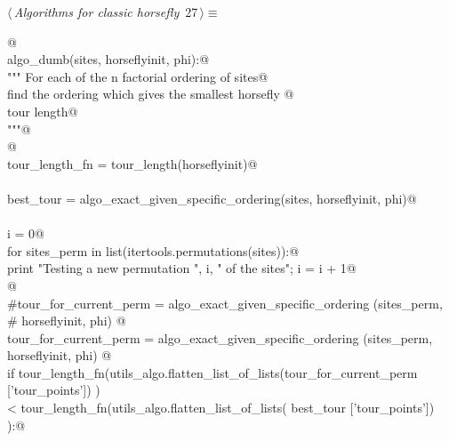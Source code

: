 \documentclass[11.5pt]{report}
\begin{document}
\begin{flushleft} \small
\begin{minipage}{\linewidth}\label{scrap34}\raggedright\small
{} $\langle\,${\itshape Algorithms for classic horsefly}\nobreak\ {\footnotesize {27}}$\,\rangle\equiv$
\vspace{-1ex}
\begin{list}{}{} \item
\mbox{}\verb@   @\\
\mbox{}\verb@def algo_dumb(sites, horseflyinit, phi):@\\
\mbox{}\verb@    """ For each of the n factorial ordering of sites@\\
\mbox{}\verb@    find the ordering which gives the smallest horsefly @\\
\mbox{}\verb@    tour length@\\
\mbox{}\verb@    """@\\
\mbox{}\verb@    @\\
\mbox{}\verb@    tour_length_fn = tour_length(horseflyinit)@\\
\mbox{}\verb@@\\
\mbox{}\verb@    best_tour = algo_exact_given_specific_ordering(sites, horseflyinit, phi)@\\
\mbox{}\verb@@\\
\mbox{}\verb@    i = 0@\\
\mbox{}\verb@    for sites_perm in list(itertools.permutations(sites)):@\\
\mbox{}\verb@        print "Testing a new permutation ", i, " of the sites"; i = i + 1@\\
\mbox{}\verb@          @\\
\mbox{}\verb@        #tour_for_current_perm = algo_exact_given_specific_ordering (sites_perm, \@\\
\mbox{}\verb@        #                                                             horseflyinit, phi) @\\
\mbox{}\verb@        tour_for_current_perm = algo_exact_given_specific_ordering (sites_perm, \@\\
\mbox{}\verb@                                                                    horseflyinit, phi) @\\
\mbox{}\verb@        if tour_length_fn(utils_algo.flatten_list_of_lists(tour_for_current_perm ['tour_points']) ) \@\\
\mbox{}\verb@         < tour_length_fn(utils_algo.flatten_list_of_lists(            best_tour ['tour_points']) ):@\\

\end{list}
\end{minipage}
\end{flushleft}
\end{document}
